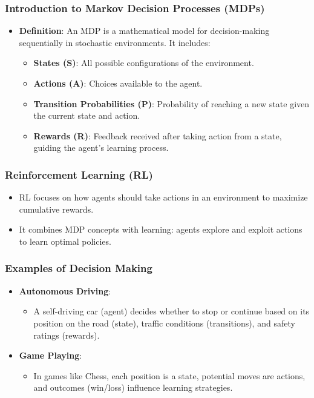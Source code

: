 \documentclass[aspectratio=169]{beamer}
\begin{document}
\begin{frame}[fragile]
    \frametitle{Introduction to Markov Decision Processes (MDPs)}
    \begin{itemize}
        \item \textbf{Definition}: An MDP is a mathematical model for decision-making sequentially in stochastic environments. It includes:
        \begin{itemize}
            \item \textbf{States (S)}: All possible configurations of the environment.
            \item \textbf{Actions (A)}: Choices available to the agent.
            \item \textbf{Transition Probabilities (P)}: Probability of reaching a new state given the current state and action.
            \item \textbf{Rewards (R)}: Feedback received after taking action from a state, guiding the agent's learning process.
        \end{itemize}
    \end{itemize}
\end{frame}

\begin{frame}[fragile]
    \frametitle{Reinforcement Learning (RL)}
    \begin{itemize}
        \item RL focuses on how agents should take actions in an environment to maximize cumulative rewards.
        \item It combines MDP concepts with learning: agents explore and exploit actions to learn optimal policies.
    \end{itemize}
\end{frame}

\begin{frame}[fragile]
    \frametitle{Examples of Decision Making}
    \begin{itemize}
        \item \textbf{Autonomous Driving}: 
        \begin{itemize}
            \item A self-driving car (agent) decides whether to stop or continue based on its position on the road (state), traffic conditions (transitions), and safety ratings (rewards).
        \end{itemize}
        \item \textbf{Game Playing}:
        \begin{itemize}
            \item In games like Chess, each position is a state, potential moves are actions, and outcomes (win/loss) influence learning strategies.
        \end{itemize}
    \end{itemize}
\end{frame}
\end{document}
